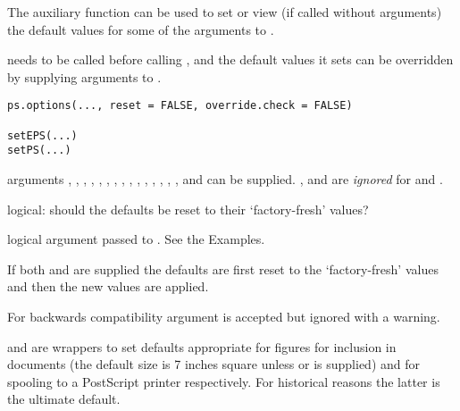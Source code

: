 %
\begin{Description}\relax
The auxiliary function  can be used to set or view
(if called without arguments) the default values for some of the
arguments to .

 needs to be called before calling ,
and the default values it sets can be overridden by supplying
arguments to .

\end{Description}
%
\begin{Usage}
\begin{verbatim}
ps.options(..., reset = FALSE, override.check = FALSE)

setEPS(...)
setPS(...)
\end{verbatim}
\end{Usage}
%
\begin{Arguments}
\begin{ldescription}
\item[\code{...}] arguments , , ,
,
, , , , ,
, ,  ,
, , ,
 and  can be supplied.  ,
 and  are \emph{ignored}
for  and .
\item[\code{reset}] logical: should the defaults be reset to their
`factory-fresh' values?
\item[\code{override.check}] logical argument passed to
.  See the Examples.
\end{ldescription}
\end{Arguments}
%
\begin{Details}\relax
If both  and  are supplied the defaults
are first reset to the `factory-fresh' values and then the new
values are applied.

For backwards compatibility argument  is accepted but
ignored with a warning.

 and  are wrappers to set defaults
appropriate for figures for inclusion in documents (the default size
is 7 inches square unless  or  is supplied)
and for spooling to a PostScript printer respectively.  For historical
reasons the latter is the ultimate default.
\end{Details}
